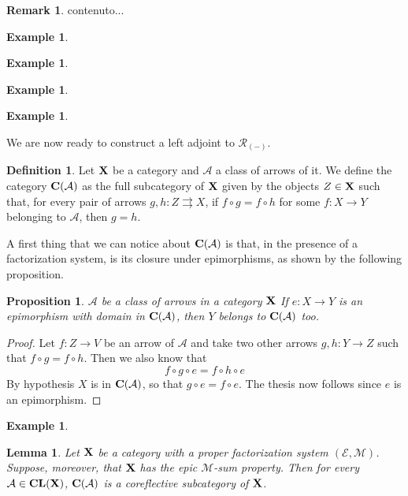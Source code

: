 \documentclass[a4paper]{article}
\newcommand{\cla}{\mathbf{CL}}
\def\C{\textbf {\textup{C}}}
\def\X{\textbf {\textup{X}}}
\newtheorem{proposition}[theorem]{Proposition}
\newtheorem{lemma}[theorem]{Lemma}
\theoremstyle{definition}
\newtheorem{definition}[theorem]{Definition}
\newtheorem{remark}[theorem]{Remark}
\newtheorem{example}[theorem]{Example}
\begin{document}
\begin{remark}
	contenuto...
\end{remark}
\begin{example}
\end{example}
\begin{example}
\end{example}

\begin{example}
\end{example}
\begin{example}
\end{example}

We are now ready to construct a left adjoint to $\mathcal{R}_{(-)}$.

\begin{definition} 
	Let $\X$ be a category and $\mathcal{A}$ a class of arrows of it. We define the category $\C(\mathcal{A})$ as the full subcategory of $\X$ given by the objects $Z\in \X$ such that, for every  pair of arrows $g,h\colon Z\rightrightarrows X$, if $f\circ g=f\circ h$ for some $f\colon X\to Y$ belonging to $\mathcal{A}$, then $g=h$.
\end{definition}

A first thing that we can notice about $\C(\mathcal{A})$ is that, in the presence of a factorization system, is its closure under epimorphisms, as shown by the following proposition.

\begin{proposition}\label{prop:ima}
 $\mathcal{A}$ be a class of arrows in a category $\X$ If $e\colon X\to Y$ is an epimorphism with domain in $\C(\mathcal{A})$, then $Y$ belongs to $\C(\mathcal{A})$ too.
\end{proposition}
\begin{proof}
	Let $f\colon Z\to V$ be an arrow of $\mathcal{A}$ and take two other arrows $g,h\colon Y\to Z$ such that $f\circ g=f\circ h$. Then we also know that
	\[f\circ g\circ e= f\circ h\circ e\]
	By hypothesis $X$ is in $\C(\mathcal{A})$, so that $g\circ e=f\circ e$. The thesis now follows since $e$ is an epimorphism.
\end{proof}
\begin{example}
\end{example}


\begin{lemma}
Let $\X$ be a category with a proper factorization system $(\mathcal{E}, \mathcal{M})$. Suppose, moreover, that $\X$ has the epic $\mathcal{M}$-sum property.  Then for every $\mathcal{A}\in \cla(\X)$, $\C(\mathcal{A})$ is a coreflective subcategory of $\X$.
\end{lemma}
\end{document}
